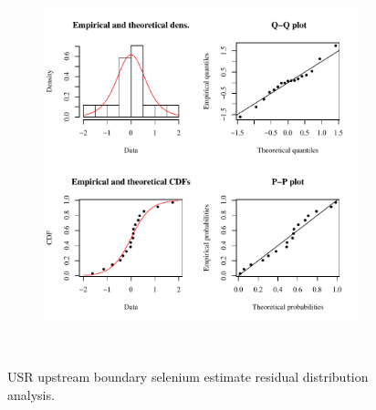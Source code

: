 \begin{linenumbers}
\begin{landscape}
\begin{figure}
\begin{subfigure}{0.7\textwidth}
			\includegraphics[width=\tableCustomSize]{"Figures/Results_USR/Stochastic/Conc Model res-fit CAN"}
		\end{subfigure}\\
		\caption{USR upstream boundary selenium estimate residual distribution analysis.}
	\end{figure}
\end{landscape}


\end{linenumbers}
